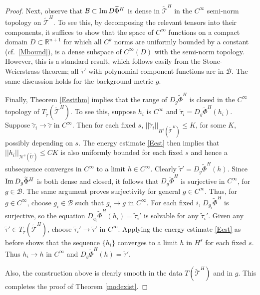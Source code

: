 \documentclass[10pt]{amsart}
\newcommand{\cT}{{\mathcal T}}
\newcommand{\cB}{{\mathcal B}}
\newcommand{\cN}{{\mathcal N}}
\newcommand{\bR}{\mathbb R}
\renewcommand{\to}{\rightarrow}
\newcommand{\<}{\langle}
\renewcommand{\>}{\rangle}
\newcommand{\w}{\widetilde}
\theoremstyle{plain}
\theoremstyle{remark}
\theoremstyle{definition}
\numberwithin{equation}{section}
\begin{document}
\begin{proof}
   Next, observe that $\cB \subset {\rm Im} \, D\w \Phi^H$ is dense in $\w \cT^H$ in the $C^{\infty}$ semi-norm topology on $\w \cT^H$. To see this, by decomposing the 
relevant tensors into their components, it suffices to show that the space of $C^{\infty}$ functions on a compact domain $D \subset \bR^{n+1}$ for which all $C^{k}$ norms 
 are uniformly bounded by a constant (cf.~\eqref{Mbound}), is a dense subspace of $C^{\infty}(D)$ with the semi-norm topology. However, this is a standard 
 result, which follows easily from the Stone-Weierstrass theorem; all $\w \tau'$ with polynomial component functions are in $\cB$. 
 The same discussion holds for the background metric $g$. 
 
    Finally, Theorem \ref{Eestthm} implies that the range of $D_g\w \Phi^H$ is closed in the $C^{\infty}$ topology of $T_{\w \tau}(\w \cT^H)$. To see this, suppose 
$h_i$ is $C^{\infty}$ and $\w \tau_i = D_g\w \Phi^H(h_i)$. Suppose $\w \tau_i \to \w \tau$ in $C^{\infty}$. Then for each fixed $s$, $||\w \tau_i||_{H^s(\w \cT^H)} \leq K$, 
for some $K$, possibly depending on $s$. The energy estimate \eqref{Eest} then implies that $||h_i||_{\cN^s(\w U)} \leq CK$ is also uniformly bounded for each 
fixed $s$ and hence a subsequence converges in $C^{\infty}$ to a limit $h \in C^{\infty}$. Clearly $\w \tau' = D_g \w \Phi^H(h)$. Since ${\rm Im} \, D_g\w \Phi^H$ 
is both dense and closed, it follows that $D_g\w \Phi^H$ is surjective in $C^{\infty}$, for $g \in \cB$. The same argument proves surjectivity for general $g \in C^{\infty}$. 
Thus, for $g \in C^{\infty}$, choose $g_i \in \cB$ such that $g_i \to g$ in $C^{\infty}$. For each fixed $i$, $D_{g_i}\w \Phi^H$ is surjective, so the equation 
$D_{g_i}\w \Phi^H(h_i) = \w \tau_i'$ is solvable for any $\w \tau_i'$. Given any $\w \tau' \in T_{\w \tau}(\w \cT^H)$, choose $\w \tau_i' \to \w \tau'$ in $C^{\infty}$. 
Applying the energy estimate \eqref{Eest} as before shows that the sequence $\{h_i \}$ 
converges to a limit $h$ in $H^s$ for each fixed $s$.  Thus $h_i \to h$ in $C^{\infty}$ and $D_g \w \Phi^H(h) = \w \tau'$.  

Also, the construction above  is clearly smooth in the data $T(\w \cT^H)$ and in $g$. This completes the proof of Theorem \ref{modexist}.  

\end{proof}
\end{document}
